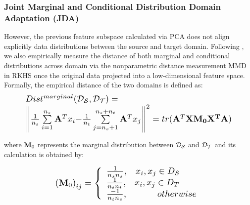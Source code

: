 \documentclass[journal,twocolumn]{IEEEtran}
\begin{document}
\begin{CJK*}{UTF8}{gkai}
\subsubsection{Joint Marginal and Conditional Distribution Domain Adaptation (\textbf{JDA})}
\label{subsubsection:JDA}
However, the previous feature subspace calculated via PCA does not align explicitly data distributions between the source and target domain.  Following \cite{long2013transfer,long2015learning}, we also empirically measure the distance of both marginal and conditional distributions across domain  via the nonparametric distance measurement MMD in RKHS \cite{borgwardt2006integrating} once the original data projected into  a low-dimensional feature space.  Formally, the empirical distance of the two domains  is defined as:
\begin{equation}\label{eq:marginal}
		\resizebox{0.90\hsize}{!}{%
	$\begin{array}{l}		
		Dis{t^{marginal}}({{\cal D}_{\cal S}},{{\cal D}_{\cal T}}) =\\ {\left\| {\frac{1}{{{n_s}}}\sum\limits_{i = 1}^{{n_s}} {{{\bf{A}}^T}{x_i} - } \frac{1}{{{n_t}}}\sum\limits_{j = {n_s} + 1}^{{n_s} + {n_t}} {{{\bf{A}}^T}{x_j}} } \right\|^2}
		= tr({{\bf{A}}^T}\bf{X}{\bf{M_0}}\bf{{X^T}A})		
	\end{array}$}
\end{equation}

where ${{\bf{M}}_0}$ represents the marginal distribution between ${{\cal D}_{\cal S}}$ and ${{\cal D}_{\cal T}}$ and its calculation is obtained by:

\begin{equation}\label{eq:M0}
		\resizebox{0.65\hsize}{!}{%
$\begin{array}{*{20}{l}}
{{{({{\bf{M}}_0})}_{ij}} = \left\{ {\begin{array}{*{20}{l}}
		{\frac{1}{{{n_s}{n_s}}},\;\;\;{x_i},{x_j} \in {D_S}}\\
		{\frac{1}{{{n_t}{n_t}}},\;\;\;{x_i},{x_j} \in {D_T}}\\
		{\frac{{ - 1}}{{{n_t}{n_s}}},\;\;\;\;\;\;\;\;\;\;\;\;otherwise}
		\end{array}} \right.}
\end{array}$}
\end{equation}



\end{CJK*}
\end{document}
